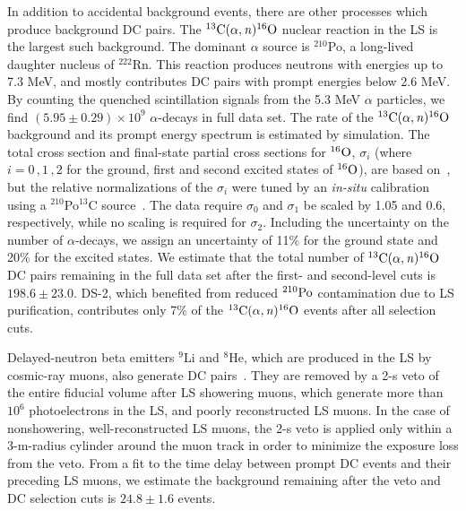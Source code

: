 \documentclass[aps,prc,twocolumn,groupedaddress,showpacs,amsmath,amssymb,floatfix,superscriptaddress]{revtex4}
\begin{document}
In addition to accidental background events, there are other processes which produce background DC pairs.  The $^{13}{\rm C}(\alpha,{\it n})^{16}{\rm O}$ nuclear reaction in the LS is the largest such background.  The dominant $\alpha$ source is $^{210}$Po, a long-lived daughter nucleus of $^{222}$Rn. This reaction produces neutrons with energies up to 7.3 MeV, and mostly contributes DC pairs with prompt energies below 2.6 MeV.  By counting the quenched scintillation signals from the 5.3 MeV $\alpha$ particles, we find \mbox{$(5.95 \pm 0.29) \times 10^{9}$} $\alpha$-decays in full data set.
The rate of the $^{13}{\rm C}(\alpha,{\it n})^{16}{\rm O}$ background and its prompt energy spectrum is estimated by simulation.  The total cross section and final-state partial cross sections for $^{16}{\rm O}$, $\sigma_{i}$ (where $i =0\,,1\,,2$ for the ground, first and second excited states of $^{16}{\rm O}$), are based on~\cite{Harissopulos2005, JENDL2005}, but the relative normalizations of the $\sigma_{i}$ were tuned by an {\it in-situ} calibration using a \mbox{$^{210}$Po$^{13}$C} source~\cite{McKee2008}. 
The data require $\sigma_0$ and $\sigma_{1}$ be scaled by 1.05 and 0.6, respectively, while no scaling is required for $\sigma_{2}$.  Including the uncertainty on the number of $\alpha$-decays, we assign an uncertainty of 11\% for the ground state and 20\% for the excited states. We estimate that the total number of $^{13}{\rm C}(\alpha,{\it n})^{16}{\rm O}$ DC pairs remaining in the full data set after the first- and second-level cuts is $198.6 \pm 23.0$. DS-2, which benefited from reduced $^{210}\rm{Po}$ contamination due to LS purification, contributes only 7\% of the $^{13}{\rm C}(\alpha,{\it n})^{16}{\rm O}$ events after all selection cuts.

Delayed-neutron beta emitters $^{9}$Li and $^{8}$He, which are produced in the LS by cosmic-ray muons, also generate DC pairs~\cite{Abe2010}.  They are removed by a 2-s veto of the entire fiducial volume after LS showering muons, which generate more than $10^{6}$ photoelectrons in the LS, and poorly reconstructed LS muons.  In the case of nonshowering, well-reconstructed LS muons, the 2-s veto is applied only within a 3-m-radius cylinder around the muon track in order to minimize the exposure loss from the veto.  From a fit to the time delay between prompt DC events and their preceding LS muons, we estimate the background remaining after the veto and DC selection cuts is $24.8 \pm 1.6$ events. 
\end{document}
